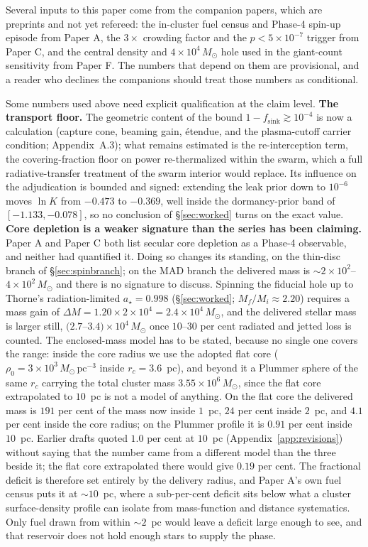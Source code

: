 \documentclass[11pt]{article}
\newcommand{\msun}{\ensuremath{M_\odot}}
\newcommand{\astar}{\ensuremath{a_\star}}
\newcommand{\lnK}{\ensuremath{\ln K}}
\begin{document}
Several inputs to this paper come from the companion papers, which are preprints and not yet refereed: the in-cluster fuel census and Phase-4 spin-up episode from Paper A, the $3\times$ crowding factor and the $p < 5\times10^{-7}$ trigger from Paper C, and the central density and $4\times10^{4}\,\msun$ hole used in the giant-count sensitivity from Paper F. The numbers that depend on them are provisional, and a reader who declines the companions should treat those numbers as conditional.

Some numbers used above need explicit qualification at the claim level. \textbf{The transport floor.} The geometric content of the bound $1 - f_{\mathrm{sink}} \gtrsim 10^{-4}$ is now a calculation (capture cone, beaming gain, \'etendue, and the plasma-cutoff carrier condition; Appendix~A.3); what remains estimated is the re-interception term, the covering-fraction floor on power re-thermalized within the swarm, which a full radiative-transfer treatment of the swarm interior would replace. Its influence on the adjudication is bounded and signed: extending the leak prior down to $10^{-6}$ moves \lnK{} from $-0.473$ to $-0.369$, well inside the dormancy-prior band of $[-1.133, -0.078]$, so no conclusion of \S\ref{sec:worked} turns on the exact value. \textbf{Core depletion is a weaker signature than the series has been claiming.} Paper A and Paper C both list secular core depletion as a Phase-4 observable, and neither had quantified it. Doing so changes its standing, on the thin-disc branch of \S\ref{sec:spinbranch}; on the MAD branch the delivered mass is $\sim 2\times10^{2}$--$4\times10^{2}\,\msun$ and there is no signature to discuss. Spinning the fiducial hole up to Thorne's radiation-limited $\astar = 0.998$ (\S\ref{sec:worked}; $M_{f}/M_{i} \approx 2.20$) requires a mass gain of $\Delta M = 1.20 \times 2\times10^{4} = 2.4\times10^{4}\,\msun$, and the delivered stellar mass is larger still, $(2.7$--$3.4)\times10^{4}\,\msun$ once $10$--$30$ per cent radiated and jetted loss is counted. The enclosed-mass model has to be stated, because no single one covers the range: inside the core radius we use the adopted flat core ($\rho_{0} = 3\times10^{3}\,\msun\,\mathrm{pc^{-3}}$ inside $r_{c} = 3.6$~pc), and beyond it a Plummer sphere of the same $r_{c}$ carrying the total cluster mass $3.55\times10^{6}\,\msun$, since the flat core extrapolated to $10$~pc is not a model of anything. On the flat core the delivered mass is $191$ per cent of the mass now inside $1$~pc, $24$ per cent inside $2$~pc, and $4.1$ per cent inside the core radius; on the Plummer profile it is $0.91$ per cent inside $10$~pc. Earlier drafts quoted $1.0$ per cent at $10$~pc (Appendix~\ref{app:revisions}) without saying that the number came from a different model than the three beside it; the flat core extrapolated there would give $0.19$ per cent. The fractional deficit is therefore set entirely by the delivery radius, and Paper A's own fuel census puts it at $\sim 10$~pc, where a sub-per-cent deficit sits below what a cluster surface-density profile can isolate from mass-function and distance systematics. Only fuel drawn from within $\sim 2$~pc would leave a deficit large enough to see, and that reservoir does not hold enough stars to supply the phase.
\end{document}
